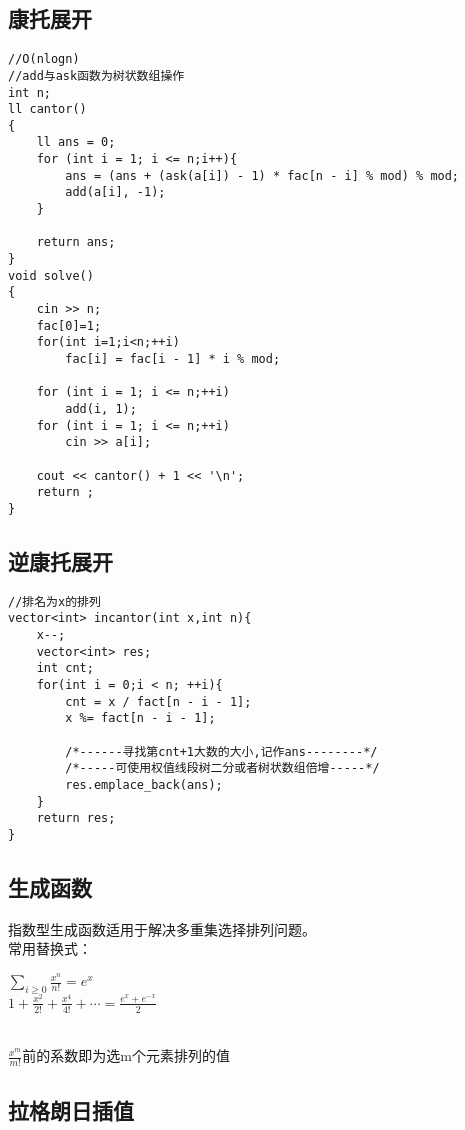 \documentclass[twocolumn,a4]{article}
\begin{document}
\subsection{康托展开}
\begin{lstlisting}
//O(nlogn)
//add与ask函数为树状数组操作
int n;
ll cantor()
{
    ll ans = 0;
    for (int i = 1; i <= n;i++){
        ans = (ans + (ask(a[i]) - 1) * fac[n - i] % mod) % mod;
        add(a[i], -1);
    }

    return ans;
}
void solve()
{
    cin >> n;
    fac[0]=1;
    for(int i=1;i<n;++i)
        fac[i] = fac[i - 1] * i % mod;

    for (int i = 1; i <= n;++i)
        add(i, 1);
    for (int i = 1; i <= n;++i)
        cin >> a[i];
        
    cout << cantor() + 1 << '\n';
    return ;
}

\end{lstlisting}

\subsection{逆康托展开}
\begin{lstlisting}
//排名为x的排列
vector<int> incantor(int x,int n){
    x--;
    vector<int> res; 
    int cnt;
    for(int i = 0;i < n; ++i){
        cnt = x / fact[n - i - 1]; 
        x %= fact[n - i - 1];
        
        /*------寻找第cnt+1大数的大小,记作ans--------*/
        /*-----可使用权值线段树二分或者树状数组倍增-----*/
        res.emplace_back(ans);
    }
    return res;
}

\end{lstlisting}
\subsection{生成函数}
指数型生成函数适用于解决多重集选择排列问题。\\
常用替换式：\\
\begin{LARGE}
    $\sum_{i\geq 0} \frac{x^{n}}{n!}=e^{x}$\\
    $1+\frac{x^{2}}{2!}+\frac{x^{4}}{4!}+\cdots =\frac{e^{x}+e^{-x}}{2}$\\
\end{LARGE}
\\
$\frac{x^{m}}{m!}$前的系数即为选m个元素排列的值

\subsection{拉格朗日插值}
\begin{lstlisting}

\end{lstlisting}
\end{document}
